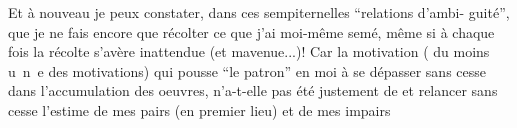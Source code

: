 Et à nouveau je peux constater, dans ces sempiternelles ``relations d'ambi-\linebreak
guité'', que je ne fais encore que récolter ce que j'ai moi-même semé, même si à
chaque fois la récolte s'avère inattendue (et mavenue...)! Car la motivation (
du moins \mbox{u n e} des motivations) qui pousse ``le patron'' en moi à se dépasser
sans cesse dans l'accumulation des oeuvres, n'a-t-elle pas été justement de 
et relancer sans cesse l'estime de mes pairs (en premier lieu) et de mes impairs
